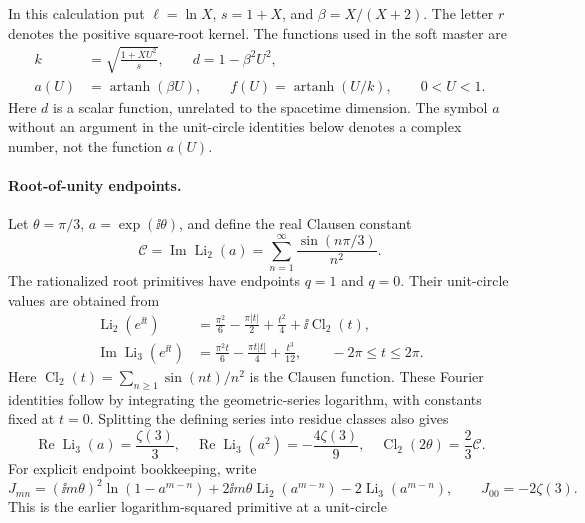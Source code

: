 In this calculation put $\ell=\ln X$, $s=1+X$, and
$\beta=X/(X+2)$. The letter $r$ denotes the positive square-root kernel. The functions used in the soft master are
\begin{align}
 k&=\sqrt{\frac{1+XU^2}{s}},\qquad d=1-\beta^2U^2,\\
 a(U)&=\operatorname{artanh}(\beta U),\qquad
 f(U)=\operatorname{artanh}(U/k),\qquad 0<U<1.
\end{align}
Here $d$ is a scalar function, unrelated to the spacetime dimension.
The symbol $a$ without an argument in the unit-circle identities
below denotes a complex number, not the function $a(U)$.

\paragraph{Root-of-unity endpoints.} Let $\theta=\pi/3$,
$a=\exp(\ii\theta)$, and define the real Clausen constant
\begin{equation}
 \mathcal C=\operatorname{Im}\operatorname{Li}_2(a)
           =\sum_{n=1}^{\infty}\frac{\sin(n\pi/3)}{n^2}.
\end{equation}
The rationalized root primitives have endpoints $q=1$ and $q=0$.
Their unit-circle values are obtained from
\begin{align}
 \operatorname{Li}_2(e^{\ii t})
 &=\frac{\pi^2}{6}-\frac{\pi|t|}{2}+\frac{t^2}{4}
       +\ii\operatorname{Cl}_2(t),\\
 \operatorname{Im}\operatorname{Li}_3(e^{\ii t})
 &=\frac{\pi^2t}{6}-\frac{\pi t|t|}{4}+\frac{t^3}{12},
                         \qquad -2\pi\leq t\leq2\pi.
\end{align}
Here $\operatorname{Cl}_2(t)=\sum_{n\geq1}\sin(nt)/n^2$ is the
Clausen function. These Fourier identities follow by integrating the geometric-series
logarithm, with constants fixed at $t=0$. Splitting the defining
series into residue classes also gives
\begin{equation}
 \operatorname{Re}\operatorname{Li}_3(a)=\frac{\zeta(3)}3,
 \quad \operatorname{Re}\operatorname{Li}_3(a^2)=-\frac{4\zeta(3)}9,
 \quad \operatorname{Cl}_2(2\theta)=\frac23\mathcal C.
\end{equation}
For explicit endpoint bookkeeping, write
\begin{equation}
 J_{mn}=(\ii m\theta)^2\ln(1-a^{m-n})
       +2\ii m\theta\operatorname{Li}_2(a^{m-n})
       -2\operatorname{Li}_3(a^{m-n}),\qquad J_{00}=-2\zeta(3).
\end{equation}
This is the earlier logarithm-squared primitive at a unit-circle
